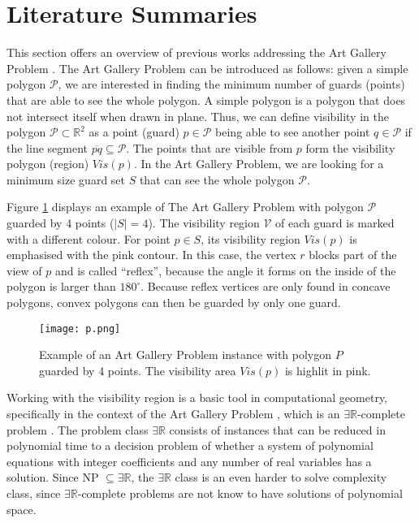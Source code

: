 \section{Literature Summaries}
This section offers an overview of previous works addressing the Art Gallery Problem \cite{o1987art}. The Art Gallery Problem \cite{o1987art} can be introduced as follows: given a simple polygon $\mathcal P$, we are interested in finding the minimum number of guards (points) that are able to see the whole polygon. A simple polygon is a polygon that does not intersect itself when drawn in plane. Thus, we can define visibility in the polygon $\mathcal P \subset \mathbb R^2$ as a point (guard) $p \in \mathcal P$ being able to see another point $q \in \mathcal P$ if the line segment $\overline{pq} \subseteq \mathcal P$. The points that are visible from $p$ form the visibility polygon (region) $Vis(p)$. In the Art Gallery Problem, we are looking for a minimum size guard set $S$ that can see the whole polygon $\mathcal P$.

Figure \ref{fig:art} displays an example of The Art Gallery Problem \cite{o1987art} with polygon $\mathcal P$ guarded by 4 points ($|S| = 4$). The visibility region $\mathcal V$ of each guard is marked with a different colour. For point $p \in S$, its visibility region $Vis(p)$ is emphasised with the pink contour. In this case, the vertex $r$ blocks part of the view of $p$ and is called ``reflex'', because the angle it forms on the inside of the polygon is larger than $180^\circ$. Because reflex vertices are only found in concave polygons, convex polygons can then be guarded by only one guard.

\begin{figure}[h!]
    \centering
    \texttt{[image: p.png]}
    \caption{Example of an Art Gallery Problem instance with polygon $P$ guarded by 4 points. The visibility area $Vis(p)$ is highlit in pink.}
    \label{fig:art}
\end{figure}


Working with the visibility region is a basic tool in computational geometry, specifically in the context of the Art Gallery Problem \cite{o1987art}, which is an $\exists \mathbb R$-complete problem \cite{abrahamsen2021art}. The problem class $\exists \mathbb R$ consists of instances that can be reduced in polynomial time to a decision problem of whether a system of polynomial equations with integer coefficients and any number of real variables has a solution. Since NP $\subseteq \exists \mathbb R$, the $\exists \mathbb R$ class is an even harder to solve complexity class, since $\exists \mathbb R$-complete problems are not know to have solutions of polynomial space. 

